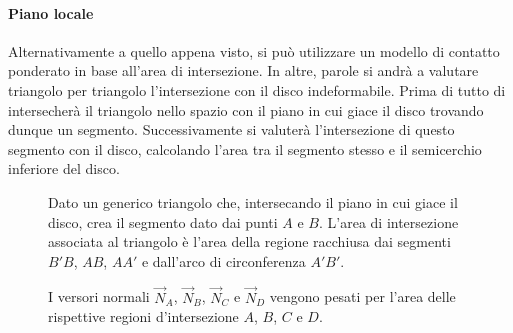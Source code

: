 \paragraph{Piano locale}
Alternativamente a quello appena visto, si può utilizzare un modello di contatto ponderato in base all'area di intersezione. In altre, parole si andrà a valutare triangolo per triangolo l'intersezione con il disco indeformabile. Prima di tutto di intersecherà il triangolo nello spazio con il piano in cui giace il disco trovando dunque un segmento. Successivamente si valuterà l'intersezione di questo segmento con il disco, calcolando l'area tra il segmento stesso e il semicerchio inferiore del disco.

\begin{figure}
	\centering
	\caption{Dato un generico triangolo che, intersecando il piano in cui giace il disco, crea il segmento dato dai punti $A$ e $B$. L'area di intersezione associata al triangolo è l'area della regione racchiusa dai segmenti $B'B$, $AB$, $AA'$ e dall'arco di circonferenza $A'B'$.}
\end{figure}
\begin{figure}
	\centering
	\caption{I versori normali $\vec{N}_A$, $\vec{N}_B$, $\vec{N}_C$ e $\vec{N}_D$ vengono pesati per l'area delle rispettive regioni d'intersezione $A$, $B$, $C$ e $D$.}
\end{figure}

